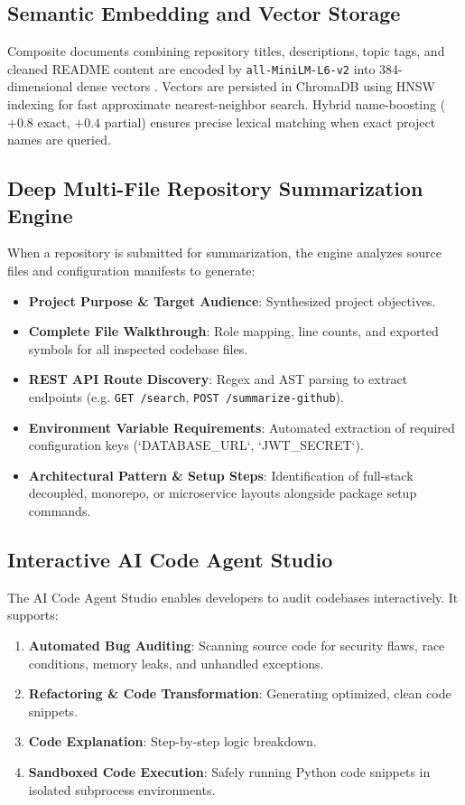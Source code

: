 \documentclass[journal]{IEEEtran}
\begin{document}
\subsection{Semantic Embedding and Vector Storage}

Composite documents combining repository titles, descriptions, topic tags, and cleaned README content are encoded by \texttt{all-MiniLM-L6-v2} into 384-dimensional dense vectors \cite{reimers2019sbert}. Vectors are persisted in ChromaDB \cite{chromadb} using HNSW indexing for fast approximate nearest-neighbor search. Hybrid name-boosting ($+0.8$ exact, $+0.4$ partial) ensures precise lexical matching when exact project names are queried.

\subsection{Deep Multi-File Repository Summarization Engine}

When a repository is submitted for summarization, the engine analyzes source files and configuration manifests to generate:
\begin{itemize}
    \item \textbf{Project Purpose \& Target Audience}: Synthesized project objectives.
    \item \textbf{Complete File Walkthrough}: Role mapping, line counts, and exported symbols for all inspected codebase files.
    \item \textbf{REST API Route Discovery}: Regex and AST parsing to extract endpoints (e.g. \texttt{GET /search}, \texttt{POST /summarize-github}).
    \item \textbf{Environment Variable Requirements}: Automated extraction of required configuration keys (`DATABASE_URL`, `JWT_SECRET`).
    \item \textbf{Architectural Pattern & Setup Steps}: Identification of full-stack decoupled, monorepo, or microservice layouts alongside package setup commands.
\end{itemize}

\subsection{Interactive AI Code Agent Studio}

The AI Code Agent Studio enables developers to audit codebases interactively. It supports:
\begin{enumerate}
    \item \textbf{Automated Bug Auditing}: Scanning source code for security flaws, race conditions, memory leaks, and unhandled exceptions.
    \item \textbf{Refactoring & Code Transformation}: Generating optimized, clean code snippets.
    \item \textbf{Code Explanation}: Step-by-step logic breakdown.
    \item \textbf{Sandboxed Code Execution}: Safely running Python code snippets in isolated subprocess environments.
\end{enumerate}
\end{document}
